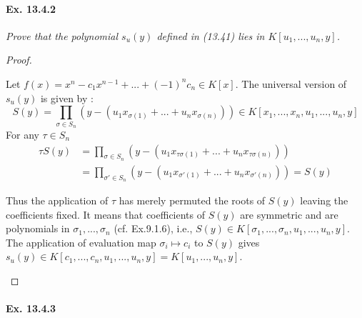 \documentclass[11pt,a4paper]{article}
\newcommand{\be} {\begin{enumerate}}
\newcommand{\ee} {\end{enumerate}}
\begin{document}
\paragraph{Ex. 13.4.2}

{\it Prove that the polynomial $s_u(y)$ defined in (13.41) lies in $K[u_1,...,u_n,y]$.
\begin{proof}
\be
Let $f(x)=x^n-c_1x^{n-1}+...+(-1)^n c_n \in K[x]$. The universal version of $s_u(y)$ is given by :
$$S(y)=\prod_{\sigma\in S_n} ( y - (u_1x_{\sigma(1)}+...+u_nx_{\sigma(n)}))\in K[x_1,...,x_n,u_1,...,u_n,y]$$
For any $\tau \in S_n$ 
\begin{align*}
\tau S(y)&=\prod_{\sigma\in S_n} ( y - (u_1x_{\tau\sigma(1)}+...+u_nx_{\tau\sigma(n)}))\\&=\prod_{\sigma'\in S_n} ( y - (u_1x_{\sigma'(1)}+...+u_nx_{\sigma'(n)}))=S(y)    
\end{align*}

Thus the application of $\tau$ has merely permuted the roots of $S(y)$ leaving the coefficients fixed. It means that coefficients of $S(y)$ are symmetric and are polynomials in $\sigma_1,...,\sigma_n$ (cf. Ex.9.1.6), i.e., $S(y)\in K[\sigma_1,...,\sigma_n,u_1,...,u_n,y]$.
The application of evaluation map $\sigma_i \mapsto c_i$ to $S(y)$ gives $s_u(y) \in K[c_1,...,c_n,u_1,...,u_n,y] = K[u_1,...,u_n,y]$. 

\ee\end{proof}
}

\paragraph{Ex. 13.4.3}
\end{document}
